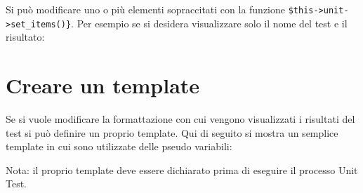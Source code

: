 Si può modificare uno o più elementi sopraccitati con la funzione \verb|$this->unit->set_items()}|. Per esempio se si desidera visualizzare solo il nome del test e il risultato:


\section*{Creare un template}
Se si vuole modificare la formattazione con cui vengono visualizzati i risultati del test si può definire un proprio template. Qui di seguito si mostra un semplice template in cui sono utilizzate delle pseudo variabili:


Nota: il proprio template deve essere dichiarato prima di eseguire il processo Unit Test.